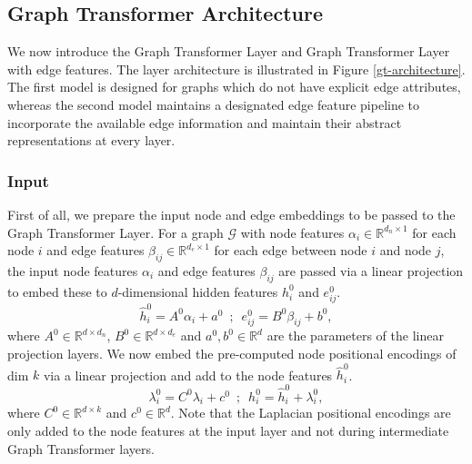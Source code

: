 \documentclass[letterpaper]{article} %
\begin{document}
\subsection{Graph Transformer Architecture}
We now introduce the Graph Transformer Layer and Graph Transformer Layer with edge features. The layer architecture is illustrated in Figure \ref{gt-architecture}. The first model is designed for graphs which do not have explicit edge attributes, whereas the second model maintains a designated edge feature pipeline to incorporate the available edge information and maintain their abstract representations at every layer.

\subsubsection{Input} First of all, we prepare the input node and edge embeddings to be passed to the Graph Transformer Layer. For a graph $\mathcal{G}$ with node features $\alpha_i \in \mathbb{R}^{d_n \times 1}$ for each node $i$ and edge features $\beta_{ij} \in \mathbb{R}^{d_e \times 1}$ for each edge between node $i$ and node $j$, the input node features $\alpha_i$ and edge features $\beta_{ij}$ are passed via a linear projection to embed these to $d$-dimensional hidden features $h_i^{0}$ and $e_{ij}^{0}$.
\begin{equation}
    \label{eqn:input_embd}
    \hat{h}_i^{0} = A^{0} \alpha_i + a^{0} \;\ ; \;\ e_{ij}^{0} = B^{0} \beta_{ij} + b^{0} ,
\end{equation}
where $A^{0} \in \mathbb{R}^{d \times d_n}$, $B^{0} \in \mathbb{R}^{d \times d_e}$ and $a^{0},b^{0}\in \mathbb{R}^{d}$ 
are the parameters of the linear projection layers.
We now embed the pre-computed node positional encodings of dim $k$ via a linear projection and add to the node features $\hat{h}_i^{0}$.
\begin{equation}
\label{eqn:pe_embd_add}
{\lambda}_i^{0} = C^{0} \lambda_i + c^{0} \;\  ; \;\ h_i^{0} = \hat{h}_i^{0} + {\lambda}_i^{0},  
\end{equation}
where $C^{0} \in \mathbb{R}^{d \times k}$ and $c^{0}\in \mathbb{R}^{d}$. Note that the Laplacian positional encodings are only added to the node features at the input layer and not during intermediate Graph Transformer layers.
\end{document}
